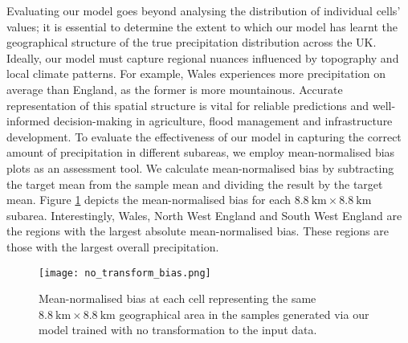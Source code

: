 \documentclass[ oneside,%
                    author={George Herbert},
                    degree={MSci},
                     title={Video Diffusion Models for Climate Simulations},
                  subtitle={}]{dissertation}
\begin{document}
Evaluating our model goes beyond analysing the distribution of individual cells' values; it is essential to determine the extent to which our model has learnt the geographical structure of the true precipitation distribution across the UK. Ideally, our model must capture regional nuances influenced by topography and local climate patterns. For example, Wales experiences more precipitation on average than England, as the former is more mountainous. Accurate representation of this spatial structure is vital for reliable predictions and well-informed decision-making in agriculture, flood management and infrastructure development. To evaluate the effectiveness of our model in capturing the correct amount of precipitation in different subareas, we employ mean-normalised bias plots as an assessment tool. We calculate mean-normalised bias by subtracting the target mean from the sample mean and dividing the result by the target mean. Figure \ref{fig:no_transform_bias} depicts the mean-normalised bias for each $8.8\ \mathrm{km}\times8.8\ \mathrm{km}$ subarea. Interestingly, Wales, North West England and South West England are the regions with the largest absolute mean-normalised bias. These regions are those with the largest overall precipitation.

\begin{figure}[htbp]
      \centering
      \texttt{[image: no\_transform\_bias.png]}
      \caption{Mean-normalised bias at each cell representing the same $8.8\ \mathrm{km}\times 8.8\ \mathrm{km}$ geographical area in the samples generated via our model trained with no transformation to the input data.}
      \label{fig:no_transform_bias}
\end{figure}
\end{document}
